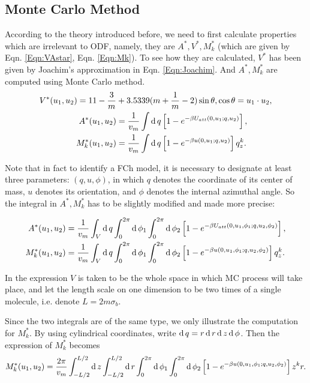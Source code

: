 \subsection{Monte Carlo Method}
According to the theory introduced before, we need to first calculate properties which are irrelevant to ODF, namely, they are $A^*, V^*, M_k^*$ (which are given by Eqn. \ref{Eqn:VAstar}, Eqn. \ref{Eqn:Mk}). To see how they are calculated, $V^*$ has been given by Joachim's approximation in Eqn. \ref{Eqn:Joachim}. And $A^*, M_k^*$ are computed using Monte Carlo method.
\begin{equation*}	
	\begin{split}
		V^*(u_1,u_2)=11-\frac{3}{m}&+3.5339(m+\frac{1}{m}-2)\sin\theta,  \cos\theta=u_1\cdot u_2,\\
		A^*(u_1,u_2)&=\frac{1}{v_m}\int\operatorname{d}q\left[1-e^{-\beta U_{att}(0,u_1;q,u_2)}\right],\\
		M_k^*(u_1,u_2)&=\frac{1}{v_m}\int\operatorname{d}q \left[1-e^{-\beta u(0,u_1;q,u_2)}\right]q_z^k.
	\end{split}
\end{equation*}

Note that in fact to identify a FCh model, it is necessary to designate at least three parameters: $(q,u,\phi)$, in which $q$ denotes the coordinate of its center of mass, $u$ denotes its orientation, and $\phi$ denotes the internal azimuthal angle. So the integral in $A^*,M_k^*$ has to be slightly modified and made more precise:

\begin{equation}
	\begin{split}
		A^*(u_1,u_2)&=\frac{1}{v_m}\int_V\operatorname{d}q \int_0^{2\pi}\operatorname{d}\phi_1\int_0^{2\pi}\operatorname{d}\phi_2 \left[1-e^{-\beta U_{att}(0,u_1,\phi_1;q,u_2,\phi_2)}\right],\\
		M_k^*(u_1,u_2)&=\frac{1}{v_m}\int_V\operatorname{d}q \int_0^{2\pi}\operatorname{d}\phi_1\int_0^{2\pi}\operatorname{d}\phi_2 \left[1-e^{-\beta u(0,u_1, \phi_1; q,u_2, \phi_2)}\right]q_z^k.
	\end{split}
\end{equation}

In the expression $V$ is taken to be the whole space in which MC process will take place, and let the length scale on one dimension to be two times of a single molecule, i.e. denote $L = 2m\sigma_b$.

Since the two integrals are of the same type, we only illustrate the computation for $M_k^*$. By using cylindrical coordinates, write $\operatorname{d}q=r\operatorname{d}r\operatorname{d}z\operatorname{d}\phi$. Then the expression of $M_k^*$ becomes
\begin{equation}\label{Eqn:IntegMk}
	M_k^*(u_1,u_2)=\frac{2\pi}{v_m}\int_{-L/2}^{L/2}\operatorname{d}z\int_{-L/2}^{L/2}\operatorname{d}r \int_0^{2\pi}\operatorname{d}\phi_1\int_0^{2\pi}\operatorname{d}\phi_2 \left[1-e^{-\beta u(0,u_1, \phi_1; q,u_2, \phi_2)}\right]z^kr.
\end{equation}


